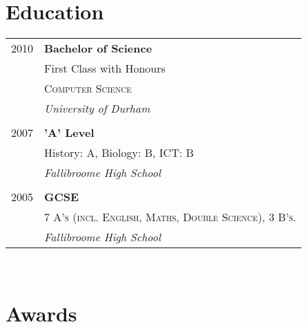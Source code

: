 \documentclass[10pt]{article} %
\begin{document}
{\begin{minipage}[t]{0.44\textwidth}

\section{Education} 

\begin{tabular}{rl} %


2010 & \textbf{Bachelor of Science} \\ 
& \small First Class with Honours \\
& \textsc{Computer Science} \\ 
& \textit{University of Durham}\\
&\\
	 

2007 & \textbf{'A' Level}\\
& \small History: A, Biology: B, ICT: B \\
& \textit{Fallibroome High School}\\
&\\
	 

2005 & \textbf{GCSE}\\
& \textsc{7 A’s (incl. English, Maths, Double Science), 3 B’s.} \\
& \textit{Fallibroome High School} 
	

\end{tabular}\\[10pt]


\section{Awards} 


\end{minipage}}
\end{document}
